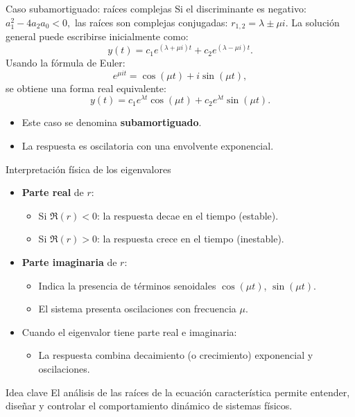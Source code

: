 \documentclass[../../main.tex]{subfiles}
\begin{document}
\begin{frame}{Caso subamortiguado: raíces complejas}
  Si el discriminante es negativo:
  \(
    a_1^2 - 4 a_2 a_0 < 0,
  \)
  las raíces son complejas conjugadas:
  \(
    r_{1,2} = \lambda \pm \mu i.
  \)
  La solución general puede escribirse inicialmente como:
  \[
    y(t) = c_1 e^{(\lambda + \mu i)t} + c_2 e^{(\lambda - \mu i)t}.
  \]
  Usando la fórmula de Euler:
  \[
    e^{\mu i t} = \cos(\mu t) + i \sin(\mu t),
  \]
  se obtiene una forma real equivalente:
  \[
    y(t) = c_1 e^{\lambda t} \cos(\mu t) + c_2 e^{\lambda t} \sin(\mu t).
  \]
  \begin{itemize}
    \item Este caso se denomina \textbf{subamortiguado}.
    \item La respuesta es oscilatoria con una envolvente exponencial.
  \end{itemize}
\end{frame}

\begin{frame}{Interpretación física de los eigenvalores}
  \begin{itemize}
    \item \textbf{Parte real} de \(r\):
    \begin{itemize}
      \item Si \(\Re(r) < 0\): la respuesta decae en el tiempo (estable).
      \item Si \(\Re(r) > 0\): la respuesta crece en el tiempo (inestable).
    \end{itemize}
    \item \textbf{Parte imaginaria} de \(r\):
    \begin{itemize}
      \item Indica la presencia de términos senoidales \(\cos(\mu t)\), \(\sin(\mu t)\).
      \item El sistema presenta oscilaciones con frecuencia \(\mu\).
    \end{itemize}
    \item Cuando el eigenvalor tiene parte real e imaginaria:
    \begin{itemize}
      \item La respuesta combina decaimiento (o crecimiento) exponencial y oscilaciones.
    \end{itemize}
  \end{itemize}
  \vspace{0.3cm}
  \begin{block}{Idea clave}
    El análisis de las raíces de la ecuación característica permite entender, diseñar y controlar el comportamiento dinámico de sistemas físicos.
  \end{block}
\end{frame}
\end{document}
